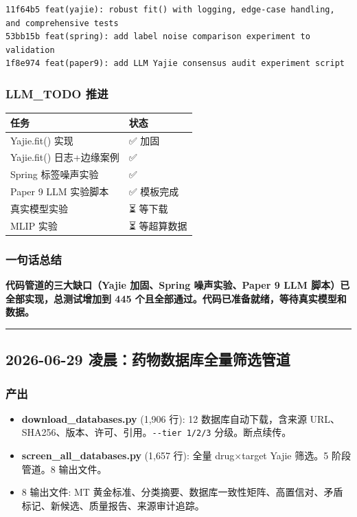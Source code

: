 \documentclass[
  12pt,
]{ctexart}
\providecommand{\tightlist}{%
  \setlength{\itemsep}{0pt}\setlength{\parskip}{0pt}}
\begin{document}
\begin{verbatim}
11f64b5 feat(yajie): robust fit() with logging, edge-case handling, and comprehensive tests
53bb15b feat(spring): add label noise comparison experiment to validation
1f8e974 feat(paper9): add LLM Yajie consensus audit experiment script
\end{verbatim}

\subsubsection{LLM\_TODO 推进}\label{llm_todo-ux63a8ux8fdb-1}

\begin{longtable}[]{@{}ll@{}}
\toprule\noalign{}
任务 & 状态 \\
\midrule\noalign{}
\endhead
\bottomrule\noalign{}
\endlastfoot
Yajie.fit() 实现 & ✅ 加固 \\
Yajie.fit() 日志+边缘案例 & ✅ \\
Spring 标签噪声实验 & ✅ \\
Paper 9 LLM 实验脚本 & ✅ 模板完成 \\
真实模型实验 & ⏳ 等下载 \\
MLIP 实验 & ⏳ 等超算数据 \\
\end{longtable}

\subsubsection{一句话总结}\label{ux4e00ux53e5ux8bddux603bux7ed3-3}

\textbf{代码管道的三大缺口（Yajie 加固、Spring 噪声实验、Paper 9 LLM
脚本）已全部实现，总测试增加到 445
个且全部通过。代码已准备就绪，等待真实模型和数据。}

\begin{center}\rule{0.5\linewidth}{0.5pt}\end{center}

\subsection{2026-06-29
凌晨：药物数据库全量筛选管道}\label{ux51ccux6668ux836fux7269ux6570ux636eux5e93ux5168ux91cfux7b5bux9009ux7ba1ux9053}

\subsubsection{产出}\label{ux4ea7ux51fa}

\begin{itemize}
\tightlist
\item
  \textbf{download\_databases.py} (1,906 行): 12 数据库自动下载，含来源
  URL、SHA256、版本、许可、引用。\texttt{-\/-tier\ 1/2/3}
  分级。断点续传。
\item
  \textbf{screen\_all\_databases.py} (1,657 行): 全量 drug×target Yajie
  筛选。5 阶段管道。8 输出文件。
\item
  8 输出文件: MT
  黄金标准、分类摘要、数据库一致性矩阵、高置信对、矛盾标记、新候选、质量报告、来源审计追踪。
\end{itemize}
\end{document}
